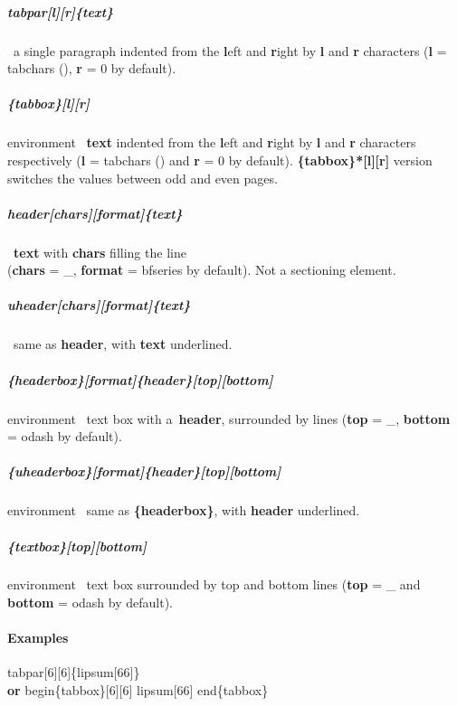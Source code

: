 \documentclass[english,12pt,openany,letterpaper]{book}
\begin{document}
\subparagraph{\bs tabpar[l][r]\{text\}} \dash\ a single paragraph indented from the \textbf{l}eft and \textbf{r}ight by \textbf{l} and \textbf{r} characters (\textbf{l} = \bs tabchars (\tabchars), \textbf{r} = 0 by default).

\subparagraph{\{tabbox\}[l][r]} environment \dash\ \textbf{text} indented from the \textbf{l}eft and \textbf{r}ight by \textbf{l} and \textbf{r} characters respectively (\textbf{l} = \bs tabchars (\tabchars) and \textbf{r} = 0 by default). \textbf{\{tabbox\}*[l][r]} version switches the values between odd and even pages.

\subparagraph{\bs header[chars][format]\{text\}} \dash\ \textbf{text} with \textbf{chars} filling the line
\\(\textbf{chars} = \bs\_, \textbf{format} = \bs bfseries by default). Not a sectioning element.

\subparagraph{\bs uheader[chars][format]\{text\}} \dash\ same as \textbf{\bs header}, with \textbf{text} underlined.

\subparagraph{\{headerbox\}[format]\{header\}[top][bottom]} environment \dash\ text box with a~\textbf{header}, surrounded by lines (\textbf{top} = \bs\_, \textbf{bottom} = \bs odash by default).

\subparagraph{\{uheaderbox\}[format]\{header\}[top][bottom]} environment \dash\ same as \textbf{\{headerbox\}}, with \textbf{header} underlined.

\subparagraph{\{textbox\}[top][bottom]} environment \dash\ text box surrounded by top and bottom lines (\textbf{top} = \bs\_ and \textbf{bottom} = \bs odash by default).

\skipline

\paragraph{Examples}


\bs tabpar[6][6]\{\bs lipsum[66]\}
\\\textbf{or} \bs begin\{tabbox\}[6][6] \bs lipsum[66] \bs end\{tabbox\}

\end{document}
